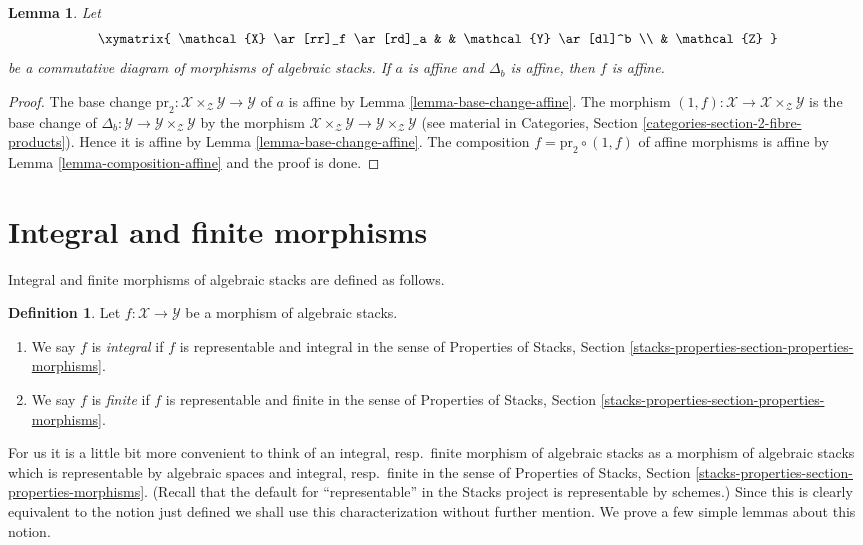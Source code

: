 \documentclass{stacks-project}
\theoremstyle{plain}
\newtheorem{lemma}[subsection]{Lemma}
\theoremstyle{definition}
\newtheorem{definition}[subsection]{Definition}
\theoremstyle{remark}
\numberwithin{equation}{subsection}
\begin{document}
\begin{lemma}
\label{lemma-affine-permanence}
Let
$$
\xymatrix{
\mathcal{X} \ar[rr]_f \ar[rd]_a & & \mathcal{Y} \ar[dl]^b \\
& \mathcal{Z}
}
$$
be a commutative diagram of morphisms of algebraic stacks.
If $a$ is affine and $\Delta_b$ is affine, then
$f$ is affine.
\end{lemma}

\begin{proof}
The base change
$\text{pr}_2 : \mathcal{X} \times_\mathcal{Z} \mathcal{Y} \to \mathcal{Y}$
of $a$ is affine by Lemma \ref{lemma-base-change-affine}. The morphism
$(1, f) : \mathcal{X} \to \mathcal{X} \times_\mathcal{Z} \mathcal{Y}$
is the base change of
$\Delta_b : \mathcal{Y} \to \mathcal{Y} \times_\mathcal{Z} \mathcal{Y}$
by the morphism $\mathcal{X} \times_\mathcal{Z} \mathcal{Y} \to
\mathcal{Y} \times_\mathcal{Z} \mathcal{Y}$ (see material in
Categories, Section \ref{categories-section-2-fibre-products}).
Hence it is affine by
Lemma \ref{lemma-base-change-affine}.
The composition $f = \text{pr}_2 \circ (1, f)$ of affine morphisms is affine by
Lemma \ref{lemma-composition-affine} and the proof is done.
\end{proof}





\section{Integral and finite morphisms}
\label{section-integral}

\noindent
Integral and finite morphisms of algebraic stacks are defined as follows.

\begin{definition}
\label{definition-integral}
Let $f : \mathcal{X} \to \mathcal{Y}$ be a morphism of algebraic stacks.
\begin{enumerate}
\item We say $f$ is {\it integral} if $f$ is representable and integral
in the sense of Properties of Stacks, Section
\ref{stacks-properties-section-properties-morphisms}.
\item We say $f$ is {\it finite} if $f$ is representable and finite
in the sense of Properties of Stacks, Section
\ref{stacks-properties-section-properties-morphisms}.
\end{enumerate}
\end{definition}

\noindent
For us it is a little bit more convenient to think of an
integral, resp.\ finite morphism of algebraic stacks as a
morphism of algebraic stacks which is
representable by algebraic spaces and integral, resp.\ finite
in the sense of Properties of Stacks, Section
\ref{stacks-properties-section-properties-morphisms}.
(Recall that the default for ``representable'' in the Stacks project
is representable by schemes.)
Since this is clearly equivalent to the notion just defined we shall
use this characterization without further mention.
We prove a few simple lemmas about this notion.
\end{document}
